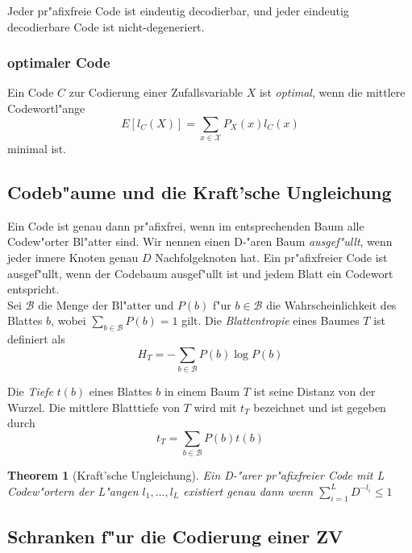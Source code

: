 \documentclass[german, 10pt, a4paper, twocolumn]{scrartcl}
\newtheorem{theorem}{Theorem}
\begin{document}
Jeder pr"afixfreie Code ist eindeutig decodierbar, und jeder eindeutig decodierbare Code ist nicht-degeneriert.

\subsubsection{optimaler Code}

Ein Code $C$ zur Codierung einer Zufallsvariable $X$ ist \textit{optimal}, wenn die mittlere Codewortl"ange
\begin{displaymath}
	E[l_C(X)]= \sum_{x\in\mathcal{X}}P_X(x)l_C(x)
\end{displaymath}
minimal ist.

\subsection{Codeb"aume und die Kraft'sche Ungleichung}

Ein Code ist genau dann pr"afixfrei, wenn im entsprechenden Baum alle Codew"orter Bl"atter sind. Wir nennen einen D-"aren Baum \textit{ausgef"ullt}, wenn jeder innere Knoten genau $D$ Nachfolgeknoten hat. Ein pr"afixfreier Code ist ausgef"ullt, wenn der Codebaum ausgef"ullt ist und jedem Blatt ein Codewort entspricht.\\

Sei $\mathcal{B}$ die Menge der Bl"atter und $P(b)$ f"ur $b\in\mathcal{B}$ die Wahrscheinlichkeit des Blattes $b$, wobei $\sum_{b\in\mathcal{B}}P(b)=1$ gilt. Die \textit{Blattentropie} eines Baumes $T$ ist definiert als
\begin{displaymath}
	H_T=-\sum_{b\in \mathcal{B}}P(b)\log P(b)
\end{displaymath}

Die \textit{Tiefe} $t(b)$ eines Blattes $b$ in einem Baum $T$ ist seine Distanz von der Wurzel. Die mittlere Blatttiefe von $T$ wird mit $t_T$ bezeichnet und ist gegeben durch
\begin{displaymath}
	t_T=\sum_{b\in\mathcal{B}}P(b)t(b)
\end{displaymath}

\begin{theorem}[Kraft'sche Ungleichung]
	Ein D-"arer pr"afixfreier Code mit L Codew"ortern der L"angen $l_1,\ldots,l_L$ existiert genau dann wenn $\sum^L_{i=1}D^{-l_i}\leq 1$
\end{theorem}

\subsection{Schranken f"ur die Codierung einer ZV}
\end{document}
